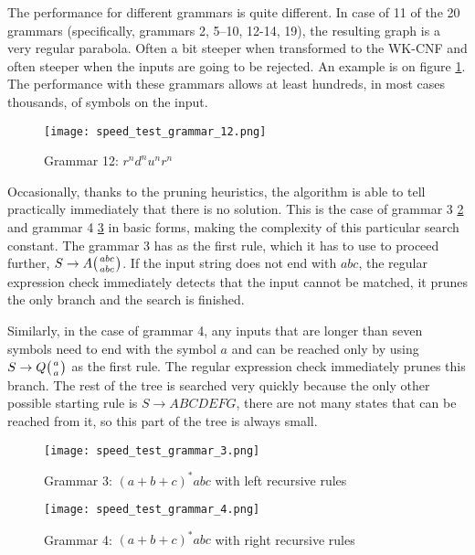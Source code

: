 The performance for different grammars is quite different. In case of 11 of the 20 grammars (specifically, grammars 2, 5--10, 12-14, 19), the resulting graph is a very regular parabola. Often a bit steeper when transformed to the WK-CNF and often steeper when the inputs are going to be rejected. An example is on figure \ref{fig:speed_test_grammar_12}. The performance with these grammars allows at least hundreds, in most cases thousands, of symbols on the input.

\begin{figure}[h!]
  \texttt{[image: speed\_test\_grammar\_12.png]}
  \caption{Grammar 12: $r^n d^n u^n r^n$}
  \label{fig:speed_test_grammar_12}
\end{figure}


Occasionally, thanks to the pruning heuristics, the algorithm is able to tell practically immediately that there is no solution. This is the case of grammar 3 \ref{fig:speed_test_grammar_3} and grammar 4 \ref{fig:speed_test_grammar_4} in basic forms, making the complexity of this particular search constant. The grammar 3 has as the first rule, which it has to use to proceed further, $S \rightarrow A \wkpair{abc}{abc}$. If the input string does not end with $abc$, the regular expression check immediately detects that the input cannot be matched, it prunes the only branch and the search is finished.

Similarly, in the case of grammar 4, any inputs that are longer than seven symbols need to end with the symbol $a$ and can be reached only by using $S \rightarrow Q \wkpair{a}{a}$ as the first rule. The regular expression check immediately prunes this branch. The rest of the tree is searched very quickly because the only other possible starting rule is $S \rightarrow A B C D E F G$, there are not many states that can be reached from it, so this part of the tree is always small.

\begin{figure}[h!]
  \texttt{[image: speed\_test\_grammar\_3.png]}
  \caption{Grammar 3: $(a+b+c)^*abc$ with left recursive rules}
  \label{fig:speed_test_grammar_3}
\end{figure}

\begin{figure}[h!]
  \texttt{[image: speed\_test\_grammar\_4.png]}
  \caption{Grammar 4: $(a+b+c)^*abc$ with right recursive rules}
  \label{fig:speed_test_grammar_4}
\end{figure}

